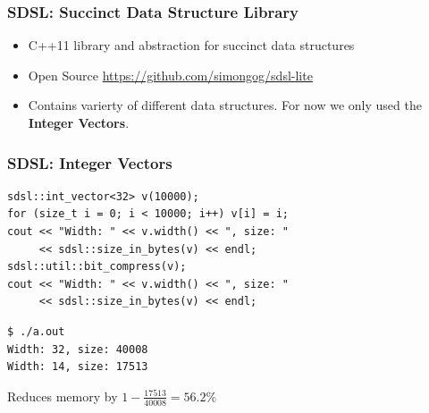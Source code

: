\documentclass{beamer}
\begin{document}
\begin{frame}
    \frametitle{SDSL: Succinct Data Structure Library}

    \begin{itemize}
        \item C++11 library and abstraction for succinct data structures
        \item Open Source \url{https://github.com/simongog/sdsl-lite}
        \item Contains varierty of different data structures. For now we only used the \textbf{Integer Vectors}.
    \end{itemize}

\end{frame}

\begin{frame}[fragile]
    \frametitle{SDSL: Integer Vectors}

\begin{lstlisting}[style=C++]
sdsl::int_vector<32> v(10000);
for (size_t i = 0; i < 10000; i++) v[i] = i;
cout << "Width: " << v.width() << ", size: " 
     << sdsl::size_in_bytes(v) << endl;
sdsl::util::bit_compress(v);
cout << "Width: " << v.width() << ", size: " 
     << sdsl::size_in_bytes(v) << endl;
\end{lstlisting}
    
\begin{lstlisting}[style=shell]
$ ./a.out
Width: 32, size: 40008
Width: 14, size: 17513
\end{lstlisting}

Reduces memory by $1 - \frac{17513}{40008} = 56.2\%$
\end{frame}
\end{document}

